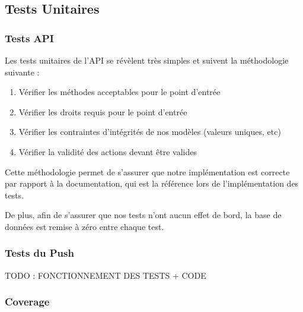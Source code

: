 \documentclass[french]{article}
\begin{document}
	\subsection{Tests Unitaires}
	\subsubsection{Tests API}
	
	Les tests unitaires de l'API se révèlent très simples et suivent la méthodologie suivante :
	
	\begin{enumerate}
		\item Vérifier les méthodes acceptables pour le point d'entrée
		\item Vérifier les droits requis pour le point d'entrée
		\item Vérifier les contraintes d'intégrités de nos modèles (valeurs uniques, etc)
		\item Vérifier la validité des actions devant être valides
	\end{enumerate}

	Cette méthodologie permet de s'assurer que notre implémentation est correcte par rapport à la documentation, qui est la référence lors de l'implémentation des tests.
	
	De plus, afin de s'assurer que nos tests n'ont aucun effet de bord, la base de données est remise à zéro entre chaque test.
	
	\subsubsection{Tests du Push}
	
	TODO : FONCTIONNEMENT DES TESTS + CODE
	
	\subsubsection{Coverage}
	
\end{document}

